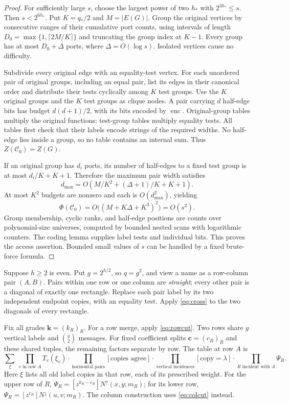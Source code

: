 \documentclass[11pt]{article}
\theoremstyle{definition}
\theoremstyle{remark}
\newcommand{\up}{N^{\uparrow}}
\newcommand{\down}{N^{\downarrow}}
\newcommand{\enc}{\operatorname{enc}}
\begin{document}
\begin{proof}
For sufficiently large $s$, choose the largest power of two $h_*$ with $2^{3h_*}\le s$. Then $s<2^{6h_*}$. Put $K=q_*/2$ and $M=|E(G)|$. Group the original vertices by consecutive ranges of their cumulative port counts, using intervals of length $D_0=\max\{1,\lceil2M/K\rceil\}$ and truncating the group index at $K-1$. Every group has at most $D_0+\Delta$ ports, where $\Delta=O(\log s)$. Isolated vertices cause no difficulty.

Subdivide every original edge with an equality-test vertex. For each unordered pair of original groups, including an equal pair, list its edges in their canonical order and distribute their tests cyclically among $K$ test groups. Use the $K$ original groups and the $K$ test groups as clique nodes. A pair carrying $d$ half-edge bits has budget $d(d+1)/2$, with its bits encoded by $\enc$. Original-group tables multiply the original functions; test-group tables multiply equality tests. All tables first check that their labels encode strings of the required widths. No half-edge lies inside a group, so no table contains an internal sum. Thus $Z(\mathcal C_0)=Z(G)$.

If an original group has $d_i$ ports, its number of half-edges to a fixed test group is at most $d_i/K+K+1$. Therefore the maximum pair width satisfies
\[
 d_{\max}=O(M/K^2+(\Delta+1)/K+K+1).
\]
At most $K^2$ budgets are nonzero and each is $O(d_{\max}^2)$, yielding
\[
 \Phi(\mathcal C_0)
 =O\bigl((M+K\Delta+K^3)^2\bigr)=O(s^2).
\]
Group membership, cyclic ranks, and half-edge positions are counts over polynomial-size universes, computed by bounded nested scans with logarithmic counters. The coding lemma supplies label tests and individual bits. This proves the access assertion. Bounded small values of $s$ can be handled by a fixed brute-force formula.
\end{proof}

Suppose $h\ge2$ is even. Put $g=2^{h/2}$, so $q=g^2$, and view a name as a row-column pair $(A,B)$. Pairs within one row or one column are \emph{straight}; every other pair is a diagonal of exactly one rectangle. Replace each pair label by its two independent endpoint copies, with an equality test. Apply \eqref{eq:cross} to the two diagonals of every rectangle.

Fix all grades $\mathbf k=(k_R)_R$. For a row merge, apply \eqref{eq:rowcut}. Two rows share $g$ vertical labels and $\binom g2$ messages. For fixed coefficient splits $\mathbf c=(c_R)_R$ and these shared tuples, the remaining factors separate by row. The table at row $A$ is
\begin{equation}\label{eq:table}
 \sum_{\xi}\ \prod_{v\text{ in row }A}T_v(\xi_v)
 \cdot\prod_{\text{horizontal pairs}}[\text{copies agree}]
 \cdot\prod_{\text{vertical incidences}}[\text{copy}=\lambda]
 \cdot\prod_{R\text{ incident with }A}\Psi_R.
\end{equation}
Here $\xi$ lists all old label copies in that row, each of its prescribed weight. For the upper row of $R$, $\Psi_R=[z^{k_R-c_R}]\up(x,y;m_R)$; for its lower row, $\Psi_R=[z^{c_R}]\down(u,v;m_R)$. The column construction uses \eqref{eq:colcut} instead.
\end{document}
